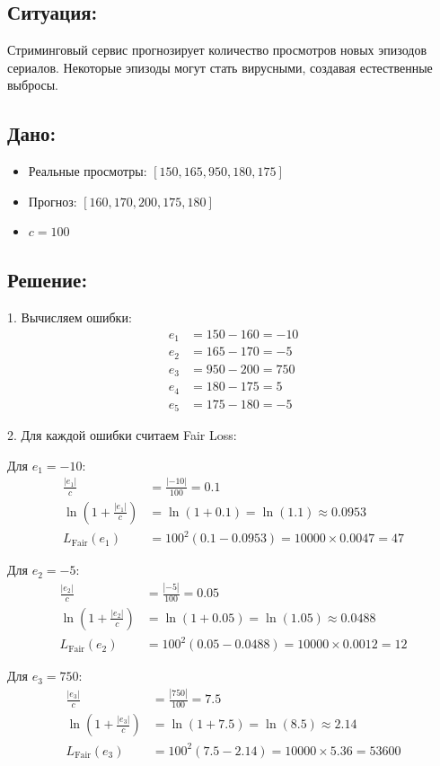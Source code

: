 \documentclass[12pt]{article}
\theoremstyle{definition}
\theoremstyle{definition}
\theoremstyle{definition}
\theoremstyle{remark}
\theoremstyle{remark}
\begin{document}
\subsection*{Ситуация:} Стриминговый сервис прогнозирует количество просмотров новых эпизодов сериалов. Некоторые эпизоды могут стать вирусными, создавая естественные выбросы.

\subsection*{Дано:}
\begin{itemize}
    \item Реальные просмотры: $[150, 165, 950, 180, 175]$
    \item Прогноз: $[160, 170, 200, 175, 180]$
    \item $c = 100$
\end{itemize}

\subsection*{Решение:}
1. Вычисляем ошибки:
\[
\begin{aligned}
e_1 &= 150 - 160 = -10 \\
e_2 &= 165 - 170 = -5 \\
e_3 &= 950 - 200 = 750 \\
e_4 &= 180 - 175 = 5 \\
e_5 &= 175 - 180 = -5
\end{aligned}
\]

2. Для каждой ошибки считаем Fair Loss:

Для $e_1 = -10$:
\[
\begin{aligned}
\frac{|e_1|}{c} &= \frac{|-10|}{100} = 0.1 \\
\ln\left(1 + \frac{|e_1|}{c}\right) &= \ln(1 + 0.1) = \ln(1.1) \approx 0.0953 \\
L_{\text{Fair}}(e_1) &= 100^2(0.1 - 0.0953) = 10000 \times 0.0047 = 47
\end{aligned}
\]

Для $e_2 = -5$:
\[
\begin{aligned}
\frac{|e_2|}{c} &= \frac{|-5|}{100} = 0.05 \\
\ln\left(1 + \frac{|e_2|}{c}\right) &= \ln(1 + 0.05) = \ln(1.05) \approx 0.0488 \\
L_{\text{Fair}}(e_2) &= 100^2(0.05 - 0.0488) = 10000 \times 0.0012 = 12
\end{aligned}
\]

Для $e_3 = 750$:
\[
\begin{aligned}
\frac{|e_3|}{c} &= \frac{|750|}{100} = 7.5 \\
\ln\left(1 + \frac{|e_3|}{c}\right) &= \ln(1 + 7.5) = \ln(8.5) \approx 2.14 \\
L_{\text{Fair}}(e_3) &= 100^2(7.5 - 2.14) = 10000 \times 5.36 = 53600
\end{aligned}
\]
\end{document}
